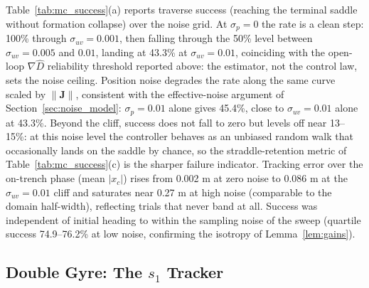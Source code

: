 \documentclass[lettersize,journal]{IEEEtran}
\begin{document}
Table~\ref{tab:mc_success}(a) reports traverse success (reaching the
terminal saddle without formation collapse) over the noise grid. At
$\sigma_p = 0$ the rate is a clean step: 100\% through
$\sigma_{uv} = 0.001$, then falling through the 50\% level between
$\sigma_{uv} = 0.005$ and $0.01$, landing at 43.3\% at
$\sigma_{uv} = 0.01$, coinciding with the open-loop $\nabla\hat{D}$
reliability threshold reported above: the estimator, not the control
law, sets the noise ceiling. Position noise degrades the rate along the same curve scaled
by $\|\mathbf{J}\|$, consistent with the effective-noise argument of
Section~\ref{sec:noise_model}: $\sigma_p = 0.01$ alone gives 45.4\%,
close to $\sigma_{uv} = 0.01$ alone at 43.3\%. Beyond the cliff, success
does not fall to zero but levels off near 13--15\%: at this noise level
the controller behaves as an unbiased random walk that occasionally
lands on the saddle by chance, so the straddle-retention metric of
Table~\ref{tab:mc_success}(c) is the sharper failure indicator. Tracking
error over the on-trench phase (mean $|x_c|$) rises from 0.002 m at zero
noise to 0.086 m at the $\sigma_{uv} = 0.01$ cliff and saturates near
0.27 m at high noise (comparable to the domain half-width), reflecting
trials that never band at all. Success was independent of initial
heading to within the sampling noise of the sweep (quartile success
74.9--76.2\% at low noise, confirming the isotropy of
Lemma~\ref{lem:gains}).

\subsection{Double Gyre: The $s_1$ Tracker}
\label{sec:results_oecs}

\end{document}
